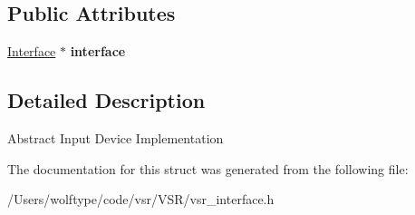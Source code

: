 \subsection*{Public Attributes}
\begin{DoxyCompactItemize}
\item 
\hypertarget{structvsr_1_1_interface_1_1_input_impl_a0a0ce4b3e1f9ed33d8c183fade38675c}{\hyperlink{classvsr_1_1_interface}{Interface} $\ast$ {\bfseries interface}}\label{structvsr_1_1_interface_1_1_input_impl_a0a0ce4b3e1f9ed33d8c183fade38675c}

\end{DoxyCompactItemize}


\subsection{Detailed Description}
Abstract Input Device Implementation 

The documentation for this struct was generated from the following file\-:\begin{DoxyCompactItemize}
\item 
/\-Users/wolftype/code/vsr/\-V\-S\-R/vsr\-\_\-interface.\-h\end{DoxyCompactItemize}
